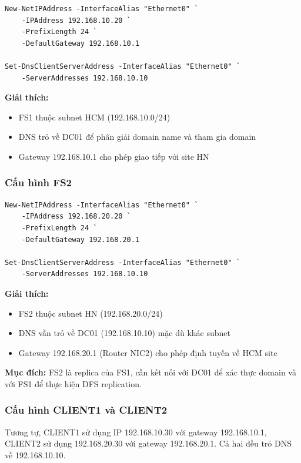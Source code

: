 \begin{lstlisting}
New-NetIPAddress -InterfaceAlias "Ethernet0" `
    -IPAddress 192.168.10.20 `
    -PrefixLength 24 `
    -DefaultGateway 192.168.10.1

Set-DnsClientServerAddress -InterfaceAlias "Ethernet0" `
    -ServerAddresses 192.168.10.10
\end{lstlisting}

\textbf{Giải thích:}
\begin{itemize}
    \item FS1 thuộc subnet HCM (192.168.10.0/24)
    \item DNS trỏ về DC01 để phân giải domain name và tham gia domain
    \item Gateway 192.168.10.1 cho phép giao tiếp với site HN
\end{itemize}

\subsubsection{Cấu hình FS2}

\begin{lstlisting}
New-NetIPAddress -InterfaceAlias "Ethernet0" `
    -IPAddress 192.168.20.20 `
    -PrefixLength 24 `
    -DefaultGateway 192.168.20.1

Set-DnsClientServerAddress -InterfaceAlias "Ethernet0" `
    -ServerAddresses 192.168.10.10
\end{lstlisting}

\textbf{Giải thích:}
\begin{itemize}
    \item FS2 thuộc subnet HN (192.168.20.0/24)
    \item DNS vẫn trỏ về DC01 (192.168.10.10) mặc dù khác subnet
    \item Gateway 192.168.20.1 (Router NIC2) cho phép định tuyến về HCM site
\end{itemize}

\textbf{Mục đích:} FS2 là replica của FS1, cần kết nối với DC01 để xác thực domain và với FS1 để thực hiện DFS replication.

\subsubsection{Cấu hình CLIENT1 và CLIENT2}

Tương tự, CLIENT1 sử dụng IP 192.168.10.30 với gateway 192.168.10.1, CLIENT2 sử dụng 192.168.20.30 với gateway 192.168.20.1. Cả hai đều trỏ DNS về 192.168.10.10.

